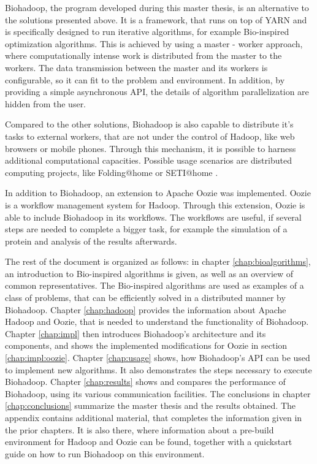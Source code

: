Biohadoop, the program developed during this master thesis, is an alternative to the solutions presented above. It is a framework, that runs on top of YARN and is specifically designed to run iterative algorithms, for example Bio-inspired optimization algorithms. This is achieved by using a master - worker approach, where computationally intense work is distributed from the master to the workers. The data transmission between the master and its workers is configurable, so it can fit to the problem and environment. In addition, by providing a simple asynchronous API, the details of algorithm parallelization are hidden from the user.

Compared to the other solutions, Biohadoop is also capable to distribute it's tasks to external workers, that are not under the control of Hadoop, like web browsers or mobile phones. Through this mechanism, it is possible to harness additional computational capacities. Possible usage scenarios are distributed computing projects, like Folding@home \cite{foldingathome} or SETI@home \cite{setiathome}.

In addition to Biohadoop, an extension to Apache Oozie \cite{islam2012oozie}\cite{oozie} was implemented. Oozie is a workflow management system for Hadoop. Through this extension, Oozie is able to include Biohadoop in its workflows. The workflows are useful, if several steps are needed to complete a bigger task, for example the simulation of a protein and analysis of the results afterwards.

The rest of the document is organized as follows: in chapter \ref{chap:bioalgorithms}, an introduction to Bio-inspired algorithms is given, as well as an overview of common representatives. The Bio-inspired algorithms are used as examples of a class of problems, that can be efficiently solved in a distributed manner by Biohadoop. Chapter \ref{chap:hadoop} provides the information about Apache Hadoop and Oozie, that is needed to understand the functionality of Biohadoop. Chapter \ref{chap:impl} then introduces Biohadoop's architecture and its components, and shows the implemented modifications for Oozie in section \ref{chap:impl:oozie}. Chapter \ref{chap:usage} shows, how Biohadoop's API can be used to implement new algorithms. It also demonstrates the steps necessary to execute Biohadoop. Chapter \ref{chap:results} shows and compares the performance of Biohadoop, using its various communication facilities. The conclusions in chapter \ref{chap:conclusions} summarize the master thesis and the results obtained. The appendix contains additional material, that completes the information given in the prior chapters. It is also there, where information about a pre-build environment for Hadoop and Oozie can be found, together with a quickstart guide on how to run Biohadoop on this environment.